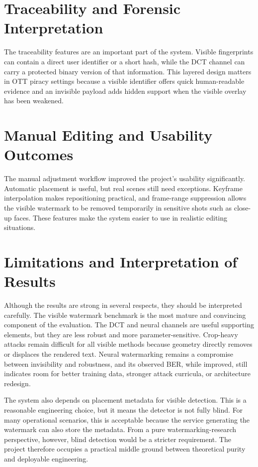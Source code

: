 \documentclass[12pt,oneside]{report}
\begin{document}
\section{Traceability and Forensic Interpretation}
The traceability features are an important part of the system. Visible fingerprints can contain a direct user identifier or a short hash, while the DCT channel can carry a protected binary version of that information. This layered design matters in OTT piracy settings because a visible identifier offers quick human-readable evidence and an invisible payload adds hidden support when the visible overlay has been weakened.

\section{Manual Editing and Usability Outcomes}
The manual adjustment workflow improved the project's usability significantly. Automatic placement is useful, but real scenes still need exceptions. Keyframe interpolation makes repositioning practical, and frame-range suppression allows the visible watermark to be removed temporarily in sensitive shots such as close-up faces. These features make the system easier to use in realistic editing situations.

\section{Limitations and Interpretation of Results}
Although the results are strong in several respects, they should be interpreted carefully. The visible watermark benchmark is the most mature and convincing component of the evaluation. The DCT and neural channels are useful supporting elements, but they are less robust and more parameter-sensitive. Crop-heavy attacks remain difficult for all visible methods because geometry directly removes or displaces the rendered text. Neural watermarking remains a compromise between invisibility and robustness, and its observed BER, while improved, still indicates room for better training data, stronger attack curricula, or architecture redesign.

The system also depends on placement metadata for visible detection. This is a reasonable engineering choice, but it means the detector is not fully blind. For many operational scenarios, this is acceptable because the service generating the watermark can also store the metadata. From a pure watermarking-research perspective, however, blind detection would be a stricter requirement. The project therefore occupies a practical middle ground between theoretical purity and deployable engineering.
\end{document}
